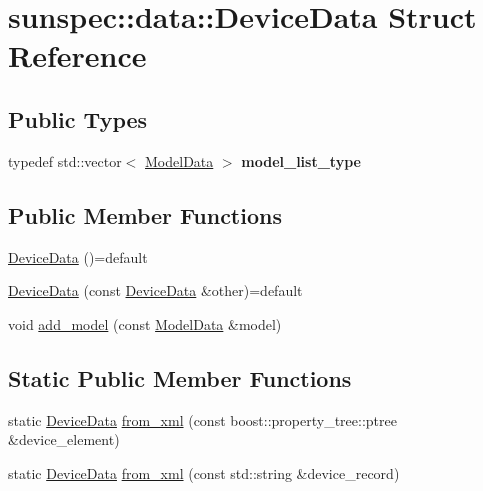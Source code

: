 \hypertarget{structsunspec_1_1data_1_1_device_data}{}\section{sunspec\+:\+:data\+:\+:Device\+Data Struct Reference}
\label{structsunspec_1_1data_1_1_device_data}
\subsection*{Public Types}
\begin{DoxyCompactItemize}
\item 
\mbox{\label{structsunspec_1_1data_1_1_device_data_a35392620b4aa510eb8dff6f84d7aaaca}} 
typedef std\+::vector$<$ \hyperlink{structsunspec_1_1data_1_1_model_data}{Model\+Data} $>$ {\bfseries model\+\_\+list\+\_\+type}
\end{DoxyCompactItemize}
\subsection*{Public Member Functions}
\begin{DoxyCompactItemize}
\item 
\hyperlink{structsunspec_1_1data_1_1_device_data_a967eadc9b8a8be0b768d6a68ff7f38ea}{Device\+Data} ()=default
\item 
\hyperlink{structsunspec_1_1data_1_1_device_data_a652eacfb6981db9e705131bfcbdfdc4b}{Device\+Data} (const \hyperlink{structsunspec_1_1data_1_1_device_data}{Device\+Data} \&other)=default
\item 
void \hyperlink{structsunspec_1_1data_1_1_device_data_a207df2dfcfc041cf9e93e2b917888030}{add\+\_\+model} (const \hyperlink{structsunspec_1_1data_1_1_model_data}{Model\+Data} \&model)
\end{DoxyCompactItemize}
\subsection*{Static Public Member Functions}
\begin{DoxyCompactItemize}
\item 
static \hyperlink{structsunspec_1_1data_1_1_device_data}{Device\+Data} \hyperlink{structsunspec_1_1data_1_1_device_data_a8b7e40e1d57748cf963a1a41dbc092d2}{from\+\_\+xml} (const boost\+::property\+\_\+tree\+::ptree \&device\+\_\+element)
\item 
static \hyperlink{structsunspec_1_1data_1_1_device_data}{Device\+Data} \hyperlink{structsunspec_1_1data_1_1_device_data_afefe7462c600a9219c04867dce19d5e3}{from\+\_\+xml} (const std\+::string \&device\+\_\+record)
\end{DoxyCompactItemize}
